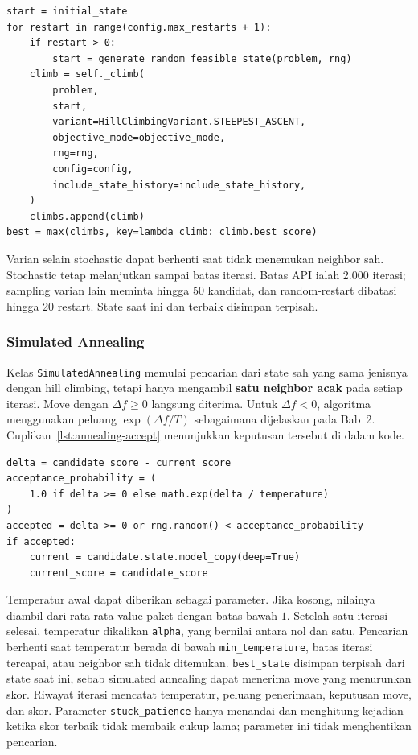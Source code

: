\documentclass[12pt,a4paper]{article}
\begin{document}
\begin{lstlisting}[emph={max_restarts,generate_random_feasible_state,STEEPEST_ASCENT,climbs,best},caption={Pengulangan steepest-ascent pada random restart},label={lst:hc-restart}]
start = initial_state
for restart in range(config.max_restarts + 1):
    if restart > 0:
        start = generate_random_feasible_state(problem, rng)
    climb = self._climb(
        problem,
        start,
        variant=HillClimbingVariant.STEEPEST_ASCENT,
        objective_mode=objective_mode,
        rng=rng,
        config=config,
        include_state_history=include_state_history,
    )
    climbs.append(climb)
best = max(climbs, key=lambda climb: climb.best_score)
\end{lstlisting}

Varian selain stochastic dapat berhenti saat tidak menemukan neighbor sah. Stochastic tetap melanjutkan sampai batas iterasi. Batas API ialah 2.000 iterasi; sampling varian lain meminta hingga 50 kandidat, dan random-restart dibatasi hingga 20 restart. State saat ini dan terbaik disimpan terpisah.

\subsubsection{Simulated Annealing}
Kelas \texttt{SimulatedAnnealing} memulai pencarian dari state sah yang sama jenisnya dengan hill climbing, tetapi hanya mengambil \textbf{satu neighbor acak} pada setiap iterasi. Move dengan $\Delta f\geq0$ langsung diterima. Untuk $\Delta f<0$, algoritma menggunakan peluang $\exp(\Delta f/T)$ sebagaimana dijelaskan pada Bab~2. Cuplikan~\ref{lst:annealing-accept} menunjukkan keputusan tersebut di dalam kode.

\begin{lstlisting}[emph={delta,acceptance_probability,accepted,temperature},caption={Penerimaan move pada \texttt{simulated\_annealing.py}},label={lst:annealing-accept}]
delta = candidate_score - current_score
acceptance_probability = (
    1.0 if delta >= 0 else math.exp(delta / temperature)
)
accepted = delta >= 0 or rng.random() < acceptance_probability
if accepted:
    current = candidate.state.model_copy(deep=True)
    current_score = candidate_score
\end{lstlisting}

Temperatur awal dapat diberikan sebagai parameter. Jika kosong, nilainya diambil dari rata-rata value paket dengan batas bawah $1$. Setelah satu iterasi selesai, temperatur dikalikan \texttt{alpha}, yang bernilai antara nol dan satu. Pencarian berhenti saat temperatur berada di bawah \texttt{min\_temperature}, batas iterasi tercapai, atau neighbor sah tidak ditemukan. \texttt{best\_state} disimpan terpisah dari state saat ini, sebab simulated annealing dapat menerima move yang menurunkan skor. Riwayat iterasi mencatat temperatur, peluang penerimaan, keputusan move, dan skor. Parameter \texttt{stuck\_patience} hanya menandai dan menghitung kejadian ketika skor terbaik tidak membaik cukup lama; parameter ini tidak menghentikan pencarian.
\end{document}
